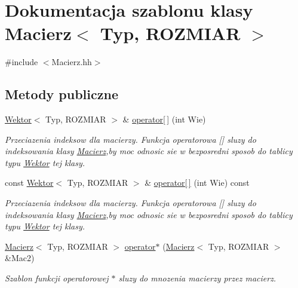 \hypertarget{class_macierz}{
\section{Dokumentacja szablonu klasy Macierz$<$ Typ, ROZMIAR $>$}
\label{class_macierz}
}


{\ttfamily \#include $<$Macierz.hh$>$}

\subsection*{Metody publiczne}
\begin{DoxyCompactItemize}
\item 
\hyperlink{class_wektor}{Wektor}$<$ Typ, ROZMIAR $>$ \& \hyperlink{class_macierz_aaa9522b86fd7a63646fd07890e45dd11}{operator\mbox{[}$\,$\mbox{]}} (int Wie)
\begin{DoxyCompactList}\small\item\em Przeciazenia indeksow dla macierzy. Funkcja operatorowa \mbox{[}\mbox{]} sluzy do indeksowania klasy \hyperlink{class_macierz}{Macierz},by moc odnosic sie w bezposredni sposob do tablicy typu \hyperlink{class_wektor}{Wektor} tej klasy. \item\end{DoxyCompactList}\item 
const \hyperlink{class_wektor}{Wektor}$<$ Typ, ROZMIAR $>$ \& \hyperlink{class_macierz_abb153212ae62cdf841f96320f891cfb2}{operator\mbox{[}$\,$\mbox{]}} (int Wie) const 
\begin{DoxyCompactList}\small\item\em Przeciazenia indeksow dla macierzy. Funkcja operatorowa \mbox{[}\mbox{]} sluzy do indeksowania klasy \hyperlink{class_macierz}{Macierz},by moc odnosic sie w bezposredni sposob do tablicy typu \hyperlink{class_wektor}{Wektor} tej klasy. \item\end{DoxyCompactList}\item 
\hyperlink{class_macierz}{Macierz}$<$ Typ, ROZMIAR $>$ \hyperlink{class_macierz_ae8f58657a41da4c9c54c4f0ed85f554e}{operator$\ast$} (\hyperlink{class_macierz}{Macierz}$<$ Typ, ROZMIAR $>$ \&Mac2)
\begin{DoxyCompactList}\small\item\em Szablon funkcji operatorowej $\ast$ sluzy do mnozenia macierzy przez macierz. \item\end{DoxyCompactList}\item 

\end{DoxyCompactItemize}
